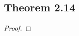 \documentclass[../../main.tex]{subfiles}
\begin{document}
\subsection{Theorem 2.14}
\begin{wts}

\end{wts}
\begin{proof}

\end{proof}
\end{document}
